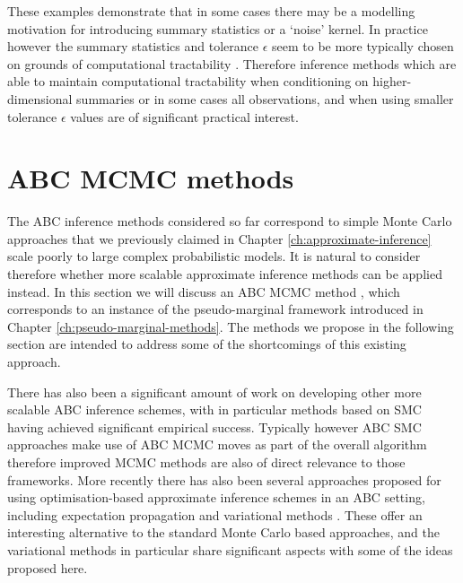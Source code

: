 These examples demonstrate that in some cases there may be a modelling motivation for introducing summary statistics or a `noise' kernel. In practice however the summary statistics and tolerance $\epsilon$ seem to be more typically chosen on grounds of computational tractability \citep{marin2012approximate,robert2010model,prangle2015summary}. Therefore inference methods which are able to maintain computational tractability when conditioning on higher-dimensional summaries or in some cases all observations, and when using smaller tolerance $\epsilon$ values are of significant practical interest.


\section{ABC MCMC methods}

The \ac{ABC} inference methods considered so far correspond to simple Monte Carlo approaches that we previously claimed in Chapter \ref{ch:approximate-inference} scale poorly to large complex probabilistic models. It is natural to consider therefore whether more scalable approximate inference methods can be applied instead. In this section we will discuss an \ac{ABC} \ac{MCMC} method \citep{marjoram2003markov,sisson2011likelihood}, which corresponds to an instance of the pseudo-marginal framework introduced in Chapter \ref{ch:pseudo-marginal-methods}. The methods we propose in the following section are intended to address some of the shortcomings of this existing approach. 

There has also been a significant amount of work on developing other more scalable \ac{ABC} inference schemes, with in particular methods based on \ac{SMC} \citep{sisson2007sequential,toni2009approximate,beaumont2009adaptive,del2012adaptive} having achieved significant empirical success. %
Typically however \ac{ABC} \ac{SMC} approaches make use of \ac{ABC} \ac{MCMC} moves as part of the overall algorithm therefore improved \ac{MCMC} methods are also of direct relevance to those frameworks. More recently there has also been several approaches proposed for using optimisation-based approximate inference schemes in an \ac{ABC} setting, including  expectation propagation \citep{barthelme2014expectation} and variational methods \citep{tran2017variational,moreno2016automatic}. These offer an interesting alternative to the standard Monte Carlo based approaches, and the variational methods in particular share significant aspects with some of the ideas proposed here. %

